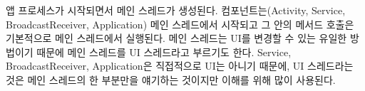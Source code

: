 앱 프로세스가 시작되면서 메인 스레드가 생성된다. 컴포넌트는(Activity, Service, BroadcastReceiver, Application) 메인 스레드에서 시작되고 그 안의 메서드 호출은 기본적으로 메인 스레드에서 실행된다. 
메인 스레드는 UI를 변경할 수 있는 유일한 방법이기 때문에 메인 스레드를 UI 스레드라고 부르기도 한다. 
Service, BroadcastReceiver, Application은 직접적으로 UI는 아니기 때문에, UI 스레드라는 것은 메인 스레드의 한 부분만을 얘기하는 것이지만 이해를 위해 많이 사용된다.\\

